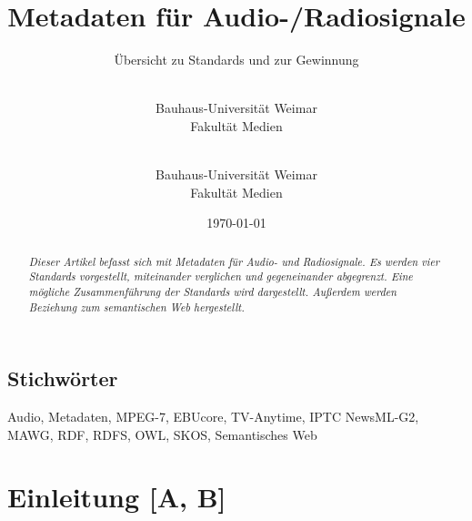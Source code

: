 

\title{Metadaten für Audio-/Radiosignale}
\subtitle{Übersicht zu Standards und zur Gewinnung}
\date{\today}
\author{
	\\
	Bauhaus-Universität Weimar\\
	Fakultät Medien\\
\and
	\\
	Bauhaus-Universität Weimar\\
	Fakultät Medien\\
}



	\maketitle
	
	\begin{abstract}
		\emph{Dieser Artikel befasst sich mit Metadaten für Audio- und Radiosignale. Es werden vier Standards vorgestellt, miteinander verglichen und gegeneinander abgegrenzt. Eine mögliche Zusammenführung der Standards wird dargestellt. Außerdem werden Beziehung zum semantischen Web hergestellt.}
	\end{abstract}
	
	\subsection{Stichwörter}
	Audio, Metadaten, MPEG-7, EBUcore, TV-Anytime, IPTC NewsML-G2, MAWG, RDF, RDFS, OWL, SKOS, Semantisches Web
	
	\section{Einleitung [A, B]}
	
